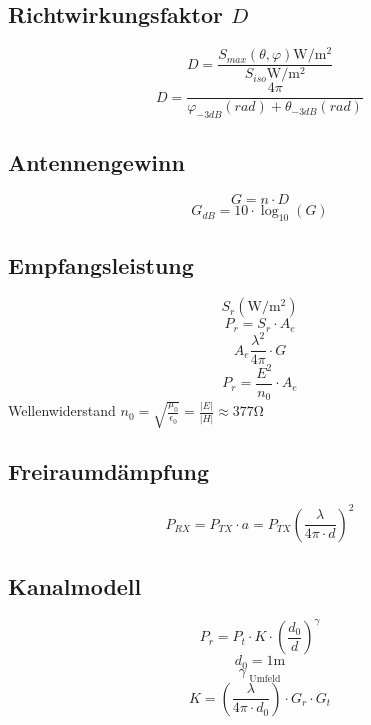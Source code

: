 \documentclass[a4paper, 10pt, fleqn]{article}
\begin{document}
\subsection{Richtwirkungsfaktor $D$}
\[ D = \frac{S_{max}(\theta, \varphi) \si{\watt\per\square\metre}}
    {S_{iso} \si{\watt\per\square\metre}} \]
\[ D = \frac{4 \pi}{\varphi_{-3dB}(rad) + \theta_{-3dB}(rad)} \]

\subsection{Antennengewinn}
\[ G = n \cdot D \]
\[ G_{dB} = 10 \cdot \log_{10}(G) \]

\subsection{Empfangsleistung}
\[ S_r (\si{\watt\per\square\metre}) \]
\[ P_r = S_r \cdot A_e \]
\[ A_e  \frac{\lambda^2}{4 \pi} \cdot G \]
\[ P_r = \frac{E^2}{n_0} \cdot A_e \]
Wellenwiderstand $n_0 = \sqrt{\frac{\mu_0}{\epsilon_0}} 
= \frac{|E|}{|H|} \approx 377\si{\ohm}$

\subsection{Freiraumdämpfung}
\[ P_{RX} = P_{TX} \cdot a = P_{TX} \left(\frac{\lambda}{4 \pi \cdot d}\right)^2 \]

\subsection{Kanalmodell}
\[ P_r = P_t \cdot K \cdot \left(\frac{d_0}{d}\right)^\gamma \]
\[ d_0 = 1\si{\metre} \]
\[ \gamma_ \text{ Umfeld} \]
\[ K = \left(\frac{\lambda}{4 \pi \cdot d_0}\right) \cdot G_r \cdot G_t \]
\end{document}
